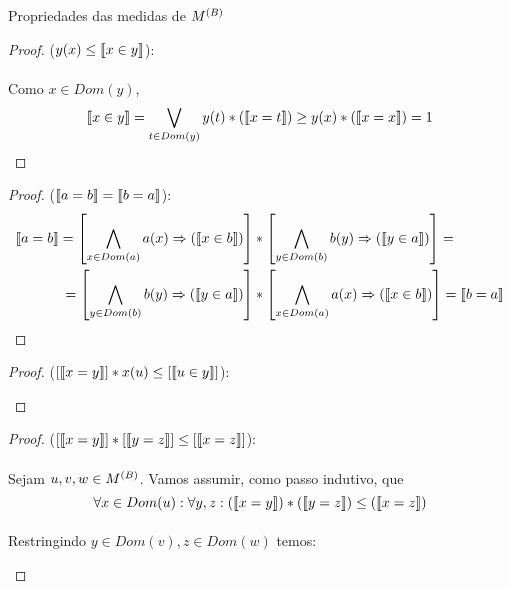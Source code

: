 \begin{proposition}{Propriedades das medidas de $\M{B}$}
\begin{proof}
            ($ y(x) \leq \Min{x}{y}$):
            \paragraph{}
                Como $x\in Dom(y)$,
            $$ \Min{x}{y} = \bigvee_{t\in Dom(y)} y(t)*(\Meq{x}{t})\geq y(x)*(\Meq{x}{x}) = 1$$\eop
        \end{proof}
        \begin{proof}
            
            ($\Meq{a}{b} = \Meq{b}{a}$):
            \begin{align*}
                \Meq{a}{b}  = \left[\bigwedge_{x\in Dom(a)}a(x)\RAR (\Min{x}{b})\right]&*\left[\bigwedge_{y\in Dom(b)}b(y)\RAR (\Min{y}{a})\right] = \\
                            = \left[\bigwedge_{y\in Dom(b)}b(y)\RAR (\Min{y}{a})\right]&*\left[\bigwedge_{x\in Dom(a)}a(x)\RAR (\Min{x}{b})\right] = \Meq{b}{a}
            \end{align*}\eop
        \end{proof}
        \begin{proof}
            
            ($[\Meq{x}{y}] *  x(u) \leq [\Min{u}{y}]$):
            \begin{prooftree}
            \end{prooftree}\eop
        \end{proof}
        \begin{proof}
            
            ($[\Meq{x}{y}] * [\Meq{y}{z}] \leq [\Meq{x}{z}]$):
            \paragraph{}
                Sejam $u,v,w\in\M{B}$. Vamos assumir, como passo indutivo, que
            $$ \forall x\in Dom(u):\forall y,z: (\Meq{x}{y}) * (\Meq{y}{z}) \leq (\Meq{x}{z})$$
            \paragraph{}
                Restringindo $y\in Dom(v), z\in Dom(w)$ temos:
            \begin{prooftree}
            \end{prooftree}

\end{proof}
\end{proposition}
